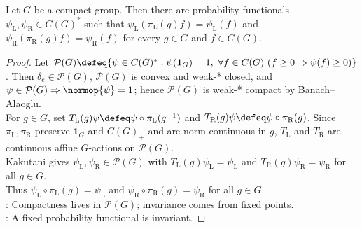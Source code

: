 \begin{theorem} \label{thm:kakutani-fixed-probability-functional-compact-group} \\
Let $G$ be a compact group. Then there are probability functionals $\psi_{\mathrm{L}},\psi_{\mathrm{R}}\in C(G)^*$ such that $\psi_{\mathrm{L}}(\pi_{\mathrm{L}}(g)f)=\psi_{\mathrm{L}}(f)$ and $\psi_{\mathrm{R}}(\pi_{\mathrm{R}}(g)f)=\psi_{\mathrm{R}}(f)$ for every $g\in G$ and $f\in C(G)$.
\begin{proof} Let $\mathcal{P}(G)\defeq\{\psi\in C(G)^*:\psi(\mathbf{1}_G)=1,\ \forall f\in C(G)\ (f\geq0\Rightarrow\psi(f)\geq0)\}$. Then $\delta_e\in\mathcal{P}(G)$, $\mathcal{P}(G)$ is convex and weak-* closed, and $\psi\in\mathcal{P}(G)\Rightarrow\normop{\psi}=1$; hence $\mathcal{P}(G)$ is weak-* compact by Banach--Alaoglu.\\
For $g\in G$, set $T_{\mathrm{L}}(g)\psi\defeq\psi\circ\pi_{\mathrm{L}}(g^{-1})$ and $T_{\mathrm{R}}(g)\psi\defeq\psi\circ\pi_{\mathrm{R}}(g)$. Since $\pi_{\mathrm{L}},\pi_{\mathrm{R}}$ preserve $\mathbf{1}_G$ and $C(G)_+$ and are norm-continuous in $g$, $T_{\mathrm{L}}$ and $T_{\mathrm{R}}$ are continuous affine $G$-actions on $\mathcal{P}(G)$.\\
Kakutani gives $\psi_{\mathrm{L}},\psi_{\mathrm{R}}\in\mathcal{P}(G)$ with $T_{\mathrm{L}}(g)\psi_{\mathrm{L}}=\psi_{\mathrm{L}}$ and $T_{\mathrm{R}}(g)\psi_{\mathrm{R}}=\psi_{\mathrm{R}}$ for all $g\in G$.\\
Thus $\psi_{\mathrm{L}}\circ\pi_{\mathrm{L}}(g)=\psi_{\mathrm{L}}$ and $\psi_{\mathrm{R}}\circ\pi_{\mathrm{R}}(g)=\psi_{\mathrm{R}}$ for all $g\in G$.\\
: Compactness lives in $\mathcal{P}(G)$; invariance comes from fixed points.\\
: A fixed probability functional is invariant.
\end{proof}
\end{theorem}

